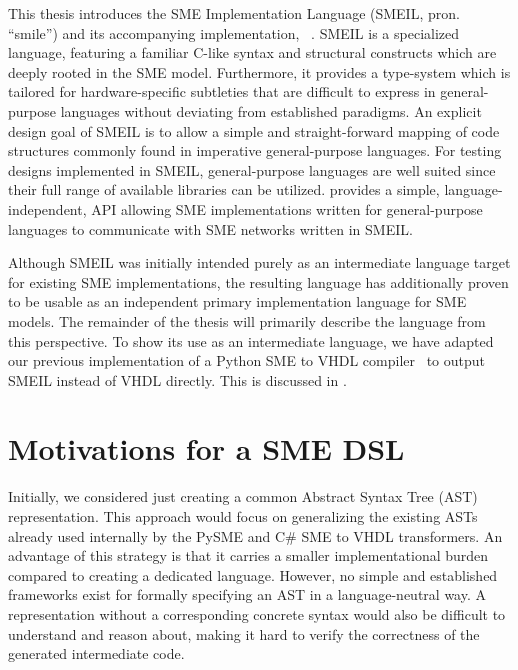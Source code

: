This thesis introduces the SME Implementation Language (SMEIL, pron. ``smile'')
and its accompanying implementation, \libsme{}~\cite{libsme}.
SMEIL is a specialized language, featuring a familiar C-like syntax and
structural constructs which are deeply rooted in the SME model. Furthermore, it
provides a type-system which is tailored for hardware-specific subtleties that
are difficult to express in general-purpose languages without deviating from
established paradigms. An explicit design goal of SMEIL is to allow a simple and
straight-forward mapping of code structures commonly found in imperative
general-purpose languages.  For testing designs implemented in SMEIL,
general-purpose languages are well suited since their full range of available
libraries can be utilized. \libsme{} provides a simple, language-independent,
API allowing SME implementations written for general-purpose languages to
communicate with SME networks written in SMEIL.

Although SMEIL was initially intended purely as an intermediate language target
for existing SME implementations, the resulting language has additionally proven
to be usable as an independent primary implementation language for SME
models. The remainder of the thesis will primarily describe the language from
this perspective. To show its use as an intermediate language, we have adapted
our previous implementation of a Python SME to VHDL compiler~\cite{almique} to
output SMEIL instead of VHDL directly. This is discussed in .


\section{Motivations for a SME DSL}
\label{sec:smemot}

Initially, we considered just creating a common Abstract Syntax Tree (AST)
representation. This approach would focus on generalizing the existing ASTs
already used internally by the PySME and C\# SME to VHDL transformers. An
advantage of this strategy is that it carries a smaller implementational burden
compared to creating a dedicated language. However, no simple and established
frameworks exist for formally specifying an AST in a language-neutral way. A
representation without a corresponding concrete syntax would also be difficult
to understand and reason about, making it hard to verify the correctness of the
generated intermediate code.

